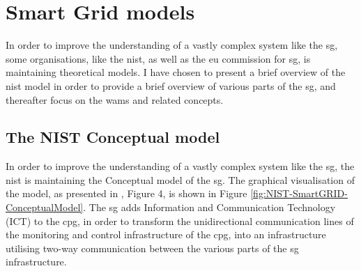 \section{Smart Grid models}
In order to improve the understanding of a vastly complex system like the \acrlong{sg}, some organisations, like the \acrfull{nist}, as well as the \acrfull{eu} commission for \acrshort{sg}, is maintaining theoretical models. I have chosen to present a brief overview of the \acrshort{nist} model in order to provide a brief overview of various parts of the \acrlong{sg}, and thereafter focus on the \acrlong{wams} and related concepts.



\subsection{The NIST Conceptual model}



In order to improve the understanding of a vastly complex system like the \acrlong{sg},
the \acrfull{nist} is maintaining the Conceptual model of the \acrlong{sg}. The graphical visualisation of the model, as presented in \cite[p. 13]{gopstein2021nist}, Figure 4,  is  shown in 
Figure \ref{fig:NIST-SmartGRID-ConceptualModel}.
The \acrlong{sg} adds Information and Communication Technology (ICT) to the \acrlong{cpg}, in order to transform the  unidirectional communication lines of the monitoring and control infrastructure of the \acrlong{cpg}, into an infrastructure utilising two-way communication between the various parts of the \acrlong{sg} infrastructure. 


